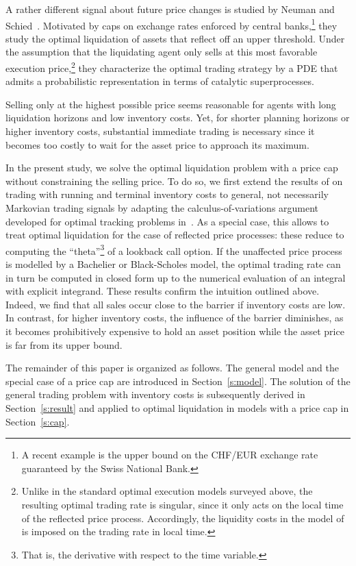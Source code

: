 \documentclass[11pt]{article}
\numberwithin{equation}{section}
\theoremstyle{definition}
\theoremstyle{remark}
\begin{document}
A rather different signal about future price changes is studied by Neuman and Schied~\cite{neuman.schied.16}. Motivated by caps on exchange rates enforced by central banks,\footnote{A recent example is the upper bound on the CHF/EUR exchange rate guaranteed by the Swiss National Bank.} they study the optimal liquidation of assets that reflect off an upper threshold.  Under the assumption that the liquidating agent only sells at this most favorable execution price,\footnote{Unlike in the standard optimal execution models surveyed above, the resulting optimal trading rate is singular, since it only acts on the local time of the reflected price process. Accordingly, the liquidity costs in the model of \cite{neuman.schied.16} is imposed on the trading rate in local time.} they characterize the optimal trading strategy by a PDE that admits a probabilistic representation in terms of catalytic superprocesses. 

Selling only at the highest possible price seems reasonable for agents with long liquidation horizons and low inventory costs. Yet, for shorter planning horizons or higher inventory costs, substantial immediate trading is necessary since it becomes too costly to wait for the asset price to approach its maximum.

In the present study, we solve the optimal liquidation problem with a price cap without constraining the selling price. To do so, we first extend the results of \cite{lehalle2017incorporating} on trading with running and terminal inventory costs to general, not necessarily Markovian trading signals by adapting the calculus-of-variations argument developed for optimal tracking problems in~\cite{bank2017hedging,bouchard2017equilibrium}. As a special case, this allows to treat optimal liquidation for the case of reflected price processes: these reduce to computing the ``theta''\footnote{That is, the derivative with respect to the time variable.} of a lookback call option. If the unaffected price process is modelled by a Bachelier or Black-Scholes model, the optimal trading rate can in turn be computed in closed form up to the numerical evaluation of an integral with explicit integrand. These results confirm the intuition outlined above. Indeed, we find that all sales occur close to the barrier if inventory costs are low. In contrast, for higher inventory costs, the influence of the barrier diminishes, as it becomes prohibitively expensive to hold an asset position while the asset price is far from its upper bound.

The remainder of this paper is organized as follows. The general model and the special case of a price cap are introduced in Section~\ref{s:model}. The solution of the general trading problem with inventory costs is subsequently derived in Section~\ref{s:result} and applied to optimal liquidation in models with a price cap in Section~\ref{s:cap}.
\end{document}

